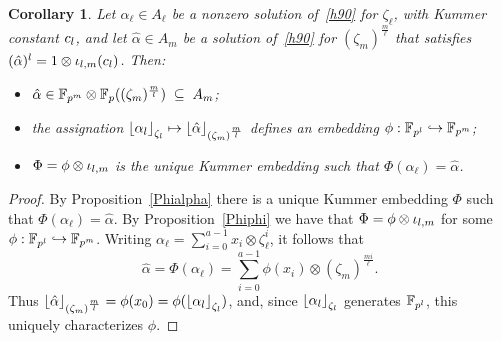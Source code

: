 \documentclass{sig-alternate}
\newtheorem{corollary}[theorem]{Corollary}
\begin{document}
\begin{corollary}
\label{alphaphi}
Let $\alpha_\ell\in A_\ell$ be a nonzero solution of~\eqref{h90} for $\zeta_\ell$,
with Kummer constant $c_l$, and
let $\hat{\alpha}\in A_m$ be a solution of~\eqref{h90} for $(\zeta_m)^{\frac{m}{\ell}}$
that satisfies $(\hat{\alpha})^l=1\otimes{\iota_{{l},{m}}}(c_l)$.
Then:
\begin{itemize}
\item
  $\hat{\alpha}\in\mathbb{F}_{p^m}\otimes\mathbb{F}_{p}((\zeta_m)^{\frac{m}{l}})\;\subseteq\;A_m$;
\item the assignation $\left\lfloor \alpha_{l} \right\rfloor_{\zeta_l}\mapsto\left\lfloor \hat{\alpha} \right\rfloor_{(\zeta_m)^{\frac{m}{l}}}$
defines an embedding $\phi:\mathbb{F}_{p^l}\hookrightarrow\mathbb{F}_{p^m}$;
\item $\Phi=\phi\otimes{\iota_{{l},{m}}}$ is the unique Kummer embedding such that $\Phi(\alpha_\ell)=\hat{\alpha}$.
\end{itemize}
\end{corollary}
\begin{proof}
By Proposition~\ref{Phialpha} there is a unique Kummer embedding $\Phi$ such that $\Phi(\alpha_\ell)=\hat{\alpha}$.
By Proposition~\ref{Phiphi} we have that $\Phi=\phi\otimes{\iota_{{l},{m}}}$ for some $\phi:\mathbb{F}_{p^l}\hookrightarrow\mathbb{F}_{p^m}$.
Writing $\alpha_\ell=\sum_{i=0}^{a-1}x_i\otimes\zeta_{\ell}^i$,
it follows that \[ \hat{\alpha}=\Phi(\alpha_\ell)=\sum_{i=0}^{a-1}\phi(x_i)\otimes(\zeta_m)^{\frac{mi}{\ell}}. \]
Thus $\left\lfloor \hat{\alpha} \right\rfloor_{(\zeta_m)^{\frac{m}{l}}}=\phi(x_0)=\phi(\left\lfloor \alpha_{l} \right\rfloor_{\zeta_l})$,
and, since $\left\lfloor \alpha_{l} \right\rfloor_{\zeta_l}$ generates $\mathbb{F}_{p^l}$, this uniquely characterizes $\phi$.
\end{proof}
\end{document}
